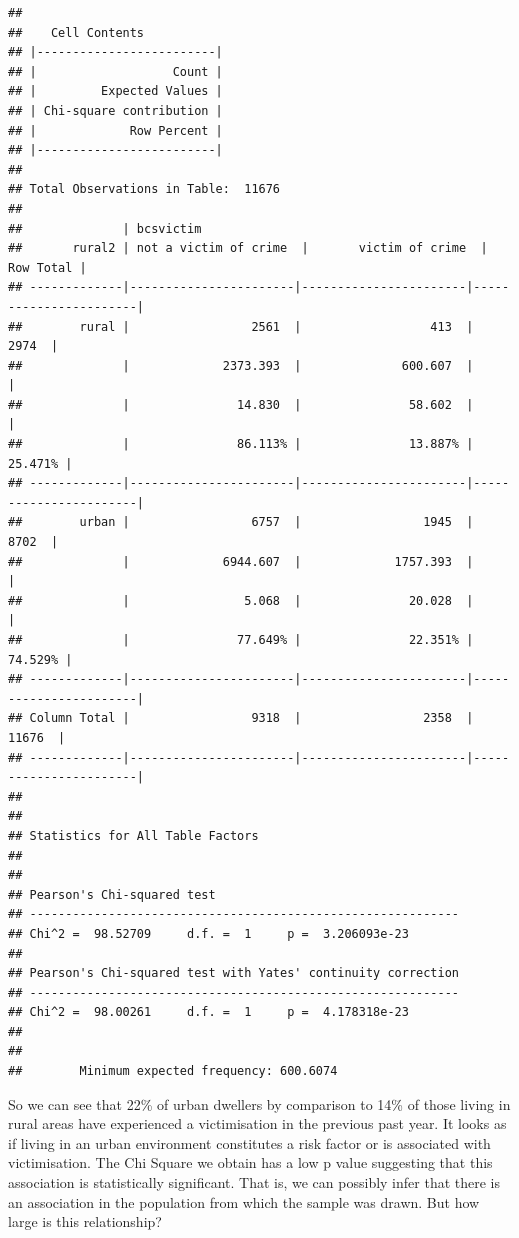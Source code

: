 \documentclass[
]{book}
\begin{document}
\begin{verbatim}
## 
##    Cell Contents
## |-------------------------|
## |                   Count |
## |         Expected Values |
## | Chi-square contribution |
## |             Row Percent |
## |-------------------------|
## 
## Total Observations in Table:  11676 
## 
##              | bcsvictim 
##       rural2 | not a victim of crime  |       victim of crime  |             Row Total | 
## -------------|-----------------------|-----------------------|-----------------------|
##        rural |                 2561  |                  413  |                 2974  | 
##              |             2373.393  |              600.607  |                       | 
##              |               14.830  |               58.602  |                       | 
##              |               86.113% |               13.887% |               25.471% | 
## -------------|-----------------------|-----------------------|-----------------------|
##        urban |                 6757  |                 1945  |                 8702  | 
##              |             6944.607  |             1757.393  |                       | 
##              |                5.068  |               20.028  |                       | 
##              |               77.649% |               22.351% |               74.529% | 
## -------------|-----------------------|-----------------------|-----------------------|
## Column Total |                 9318  |                 2358  |                11676  | 
## -------------|-----------------------|-----------------------|-----------------------|
## 
##  
## Statistics for All Table Factors
## 
## 
## Pearson's Chi-squared test 
## ------------------------------------------------------------
## Chi^2 =  98.52709     d.f. =  1     p =  3.206093e-23 
## 
## Pearson's Chi-squared test with Yates' continuity correction 
## ------------------------------------------------------------
## Chi^2 =  98.00261     d.f. =  1     p =  4.178318e-23 
## 
##  
##        Minimum expected frequency: 600.6074
\end{verbatim}

So we can see that 22\% of urban dwellers by comparison to 14\% of those living in rural areas have experienced a victimisation in the previous past year. It looks as if living in an urban environment constitutes a risk factor or is associated with victimisation. The Chi Square we obtain has a low p value suggesting that this association is statistically significant. That is, we can possibly infer that there is an association in the population from which the sample was drawn. But how large is this relationship?
\end{document}
